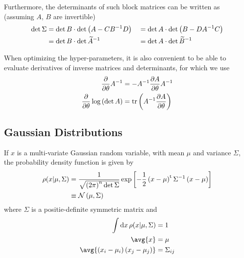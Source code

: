 \documentclass[nobib]{tufte-handout}
\begin{document}
Furthermore, the determinants of such block matrices can be written as (assuming $A$, $B$ are invertible)
\begin{align}
  \det{\Sigma} &= \det{B}\cdot\det{\left(A - CB^{-1}D\right)} &&= \det{A}\cdot\det{\left(B - DA^{-1}C\right)}\label{e:block_det}\\
  &= \det{B}\cdot\det{\widetilde{A}^{-1}} &&= \det{A}\cdot\det{\widetilde{B}^{-1}}\notag
\end{align}

When optimizing the hyper-parameters, it is also convenient to be able to evaluate derivatives of inverse matrices and determinants, for which we use
\begin{align}
  \frac{\partial}{\partial \theta} A^{-1} &= -A^{-1} \frac{\partial A}{\partial \theta}A^{-1} \label{e:dA1}\\
  \frac{\partial}{\partial \theta}\log{\left(\det A\right)}&= \operatorname{tr}{\left(A^{-1} \frac{\partial A}{\partial \theta}\right)}\label{e:dA2}
\end{align}

\subsection{Gaussian Distributions}
If $x$ is a multi-variate Gaussian random variable, with mean $\mu$ and variance $\Sigma$, the probability density function
is given by
\begin{align}
  \rho(x\lvert\mu, \Sigma) &= \frac{1}{\sqrt{\left(2\pi\right)^n \det{\Sigma}}} \exp{\left[-\frac{1}{2}\left(x - \mu\right)^\textrm{t} 
  \Sigma^{-1} \left(x - \mu\right)\right]}\label{e:gaussian_pdf}\\
  &\equiv \mathcal{N}\left(\mu, \Sigma\right)\notag
\end{align}
where $\Sigma$ is a positie-definite symmetric matrix and 
\begin{align}
  \int\df{x}\rho(x\lvert\mu, \Sigma) &= 1\label{e:gaussian_norm}\\
  \avg{x} &= \mu \label{e:gaussian_mu}\\
  \avg{\left(x_i-\mu_i\right)\left(x_j - \mu_j\right)} &= \Sigma_{ij}\label{e:gaussian_sigma}
  \end{align}
\end{document}

